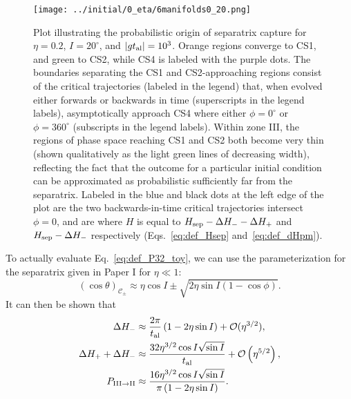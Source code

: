 \documentclass[
        fleqn,
        usenatbib,
        referee,
    ]{mnras}
\newcommand*{\abs}[1]{\left|#1\right|}
\newcommand*{\p}[1]{\left(#1\right)}
\newlength{\colummwidth}
\begin{document}
\begin{figure}
    \centering
    \texttt{[image: ../initial/0\_eta/6manifolds0\_20.png]}
    \caption{Plot illustrating the probabilistic origin of separatrix capture
    for $\eta = 0.2$, $I = 20^\circ$, and $\abs{gt_{\rm al}} = 10^{3}$. Orange
    regions converge to CS1, and green to CS2, while CS4 is labeled with the
    purple dots. The boundaries separating the CS1 and CS2-approaching regions
    consist of the critical trajectories (labeled in the legend) that, when
    evolved either forwards or backwards in time (superscripts in the legend
    labels), asymptotically approach CS4 where either $\phi = 0^\circ$ or $\phi
    = 360^\circ$ (subscripts in the legend labels). Within zone III, the regions
    of phase space reaching CS1 and CS2 both become very thin (shown
    qualitatively as the light green lines of decreasing width), reflecting the
    fact that the outcome for a particular initial condition can be approximated
    as probabilistic sufficiently far from the separatrix. Labeled in the blue
    and black dots at the left edge of the plot are the two backwards-in-time
    critical trajectories intersect $\phi = 0$, and are where $H$ is equal to
    $H_{\rm sep} - \Delta H_- - \Delta H_+$ and $H_{\rm sep} - \Delta H_-$
    respectively (Eqs.~\ref{eq:def_Hsep} and~\ref{eq:def_dHpm}).
    }\label{fig:toy_hop_manifolds}
\end{figure}

To actually evaluate Eq.~\eqref{eq:def_P32_toy}, we can use the parameterization
for the separatrix given in Paper I for $\eta \ll 1$:
\begin{equation}
    \p{\cos \theta}_{\mathcal{C}_{\pm}} \approx
        \eta \cos I \pm \sqrt{2\eta\sin I\p{1 - \cos \phi}}.
        \label{eq:sep_theta}
\end{equation}
It can then be shown that
\begin{align}
    \Delta H_- &\approx \frac{2\pi}{t_{\rm al}}\p{1
        - 2\eta \sin I} + \mathcal{O}(\eta^{3/2}),\\
    \Delta H_+ + \Delta H_- &\approx
        \frac{32 \eta^{3/2}\cos I \sqrt{\sin I}}{t_{\rm al}}
            + \mathcal{O}\p{\eta^{5/2}},\\
    P_{\rm III \to II} &\approx
        \frac{16 \eta^{3/2} \cos I \sqrt{\sin I}}{\pi
            \p{1  - 2\eta \sin I}}.\label{eq:P32_toy}
\end{align}
\end{document}

